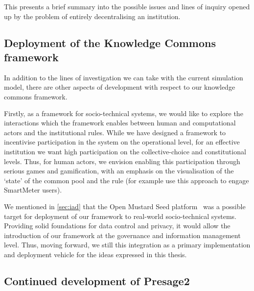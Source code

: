 This presents a brief summary into the possible issues and lines of inquiry opened up by the problem of entirely decentralising an institution.

\subsection{Deployment of the Knowledge Commons framework}

In addition to the lines of investigation we can take with the current
simulation model, there are other aspects of development with respect to our
knowledge commons framework.

Firstly, as a framework for socio-technical systems, we would like to explore
the interactions which the framework enables between human and computational
actors and the institutional rules. While we have designed a framework to
incentivise participation in the system on the operational level, for an
effective institution we want high participation on the collective-choice and
constitutional levels. Thus, for human actors, we envision enabling this
participation through serious games and gamification, with an emphasis on the
visualisation of the `state' of the common pool and the rule (for example
\citet{Bourazeri12} use this approach to engage SmartMeter users). 

We mentioned in \autoref{sec:iad} that the Open Mustard Seed
platform~\citep{Hardjono2014a} was a possible target for deployment of our
framework to real-world socio-technical systems. Providing solid foundations
for data control and privacy, it would allow the introduction of our framework
at the governance and information management level. Thus, moving forward, we
still this integration as a primary implementation and deployment vehicle for
the ideas expressed in this thesis.


\subsection{Continued development of Presage2}

